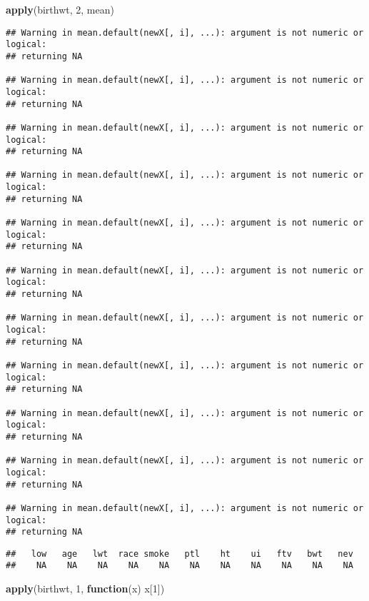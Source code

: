 \documentclass[
]{book}
\newenvironment{Shaded}{\begin{snugshade}}{\end{snugshade}}
\newcommand{\ControlFlowTok}[1]{\textcolor[rgb]{0.13,0.29,0.53}{\textbf{#1}}}
\newcommand{\DecValTok}[1]{\textcolor[rgb]{0.00,0.00,0.81}{#1}}
\newcommand{\KeywordTok}[1]{\textcolor[rgb]{0.13,0.29,0.53}{\textbf{#1}}}
\newcommand{\NormalTok}[1]{#1}
\begin{document}
\begin{Shaded}
\begin{Highlighting}[]
\KeywordTok{apply}\NormalTok{(birthwt, }\DecValTok{2}\NormalTok{, mean)}
\end{Highlighting}
\end{Shaded}

\begin{verbatim}
## Warning in mean.default(newX[, i], ...): argument is not numeric or logical:
## returning NA

## Warning in mean.default(newX[, i], ...): argument is not numeric or logical:
## returning NA

## Warning in mean.default(newX[, i], ...): argument is not numeric or logical:
## returning NA

## Warning in mean.default(newX[, i], ...): argument is not numeric or logical:
## returning NA

## Warning in mean.default(newX[, i], ...): argument is not numeric or logical:
## returning NA

## Warning in mean.default(newX[, i], ...): argument is not numeric or logical:
## returning NA

## Warning in mean.default(newX[, i], ...): argument is not numeric or logical:
## returning NA

## Warning in mean.default(newX[, i], ...): argument is not numeric or logical:
## returning NA

## Warning in mean.default(newX[, i], ...): argument is not numeric or logical:
## returning NA

## Warning in mean.default(newX[, i], ...): argument is not numeric or logical:
## returning NA

## Warning in mean.default(newX[, i], ...): argument is not numeric or logical:
## returning NA
\end{verbatim}

\begin{verbatim}
##   low   age   lwt  race smoke   ptl    ht    ui   ftv   bwt   nev 
##    NA    NA    NA    NA    NA    NA    NA    NA    NA    NA    NA
\end{verbatim}

\begin{Shaded}
\begin{Highlighting}[]
\KeywordTok{apply}\NormalTok{(birthwt, }\DecValTok{1}\NormalTok{, }\ControlFlowTok{function}\NormalTok{(x) x[}\DecValTok{1}\NormalTok{])}
\end{Highlighting}
\end{Shaded}
\end{document}
